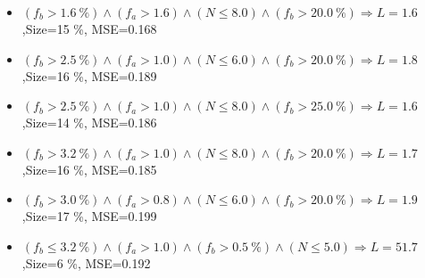 \documentclass[numbered]{CSL}
\begin{document}
\begin{itemize}
\item $(f_b > 1.6~\%) \land (f_a > 1.6) \land (N \leq 8.0) \land (f_b > 20.0~\%) \Rightarrow L = 1.6$,\hfill Size=15 \%, MSE=0.168
\item $(f_b > 2.5~\%) \land (f_a > 1.0) \land (N \leq 6.0) \land (f_b > 20.0~\%) \Rightarrow L = 1.8$,\hfill Size=16 \%, MSE=0.189
\item $(f_b > 2.5~\%) \land (f_a > 1.0) \land (N \leq 8.0) \land (f_b > 25.0~\%) \Rightarrow L = 1.6$,\hfill Size=14 \%, MSE=0.186
\item $(f_b > 3.2~\%) \land (f_a > 1.0) \land (N \leq 8.0) \land (f_b > 20.0~\%) \Rightarrow L = 1.7$,\hfill Size=16 \%, MSE=0.185
\item $(f_b > 3.0~\%) \land (f_a > 0.8) \land (N \leq 6.0) \land (f_b > 20.0~\%) \Rightarrow L = 1.9$,\hfill Size=17 \%, MSE=0.199
\item $(f_b \leq 3.2~\%) \land (f_a > 1.0) \land (f_b > 0.5~\%) \land (N \leq 5.0) \Rightarrow L = 51.7$,\hfill Size=6 \%, MSE=0.192
\end{itemize}
\end{document}
